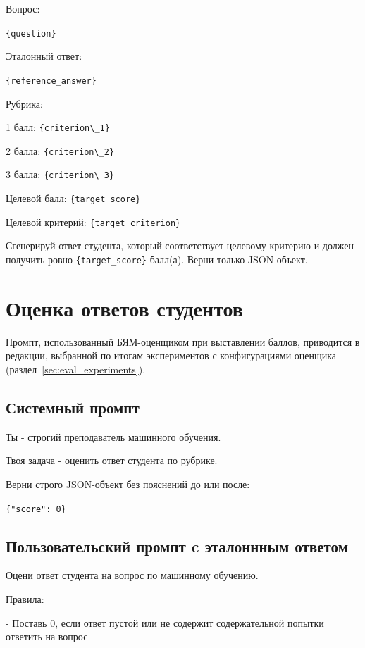 Вопрос:

\verb|{question}|
   
\vspace{1em}
Эталонный ответ:

\verb|{reference_answer}|
   
\vspace{1em}
Рубрика:

1 балл: \verb|{criterion\_1}|

2 балла: \verb|{criterion\_2}|

3 балла: \verb|{criterion\_3}|
  
\vspace{1em}
Целевой балл: \verb|{target_score}|

Целевой критерий: \verb|{target_criterion}|
  
\vspace{1em}
Сгенерируй ответ студента, который соответствует целевому
критерию и должен получить ровно \verb|{target_score}| балл(а).
Верни только JSON-объект.
 
\section{Оценка ответов студентов}
\label{app:prompts:evaluation}
 
Промпт, использованный БЯМ-оценщиком при выставлении баллов,
приводится в редакции, выбранной по итогам экспериментов с
конфигурациями оценщика (раздел~\ref{sec:eval_experiments}).
 
\subsection{Системный промпт}

Ты - строгий преподаватель машинного обучения.

Твоя задача - оценить ответ студента по рубрике.

\vspace{1em}
Верни строго JSON-объект без пояснений до или после:

\verb|{"score": 0}|

\subsection{Пользовательский промпт c эталоннным ответом}
Оцени ответ студента на вопрос по машинному обучению.

\vspace{1em}
Правила:

- Поставь 0, если ответ пустой или не содержит содержательной попытки ответить на вопрос

